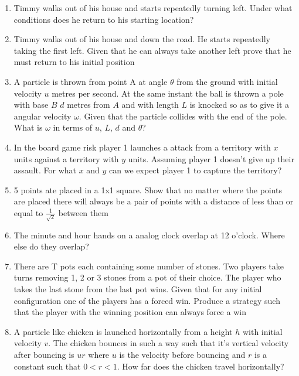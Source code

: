 \documentclass[a4paper]{article}
\begin{document}
\begin{enumerate}
\item
Timmy walks out of his house and starts repeatedly turning left. Under what conditions does he return to his starting location?

\item
Timmy walks out of his house and down the road. He starts repeatedly taking the first left. Given that he can always take another left prove that he must return to his initial position

\item
A particle is thrown from point A at angle $\theta$ from the ground with initial velocity $u$ metres per second. At the same instant the ball is thrown a pole with base $B$ $d$ metres from $A$ and with length $L$ is knocked so as to give it a angular velocity $\omega$. Given that the particle collides with the end of the pole. What is $\omega$ in terms of $u$, $L$, $d$ and $\theta$?

\item
In the board game risk player 1 launches a attack from a territory with $x$ units against a territory with $y$ units. Assuming player 1 doesn’t give up their assault. For what $x$ and $y$ can we expect player 1 to capture the territory?

\item
5 points ate placed in a 1x1 square. Show that no matter where the points are placed there will always be a pair of points with a distance of less than or equal to $\frac{1}{\sqrt{2}}$ between them

\item
The minute and hour hands on a analog clock overlap at 12 o’clock. Where else do they overlap?

\item
There are T pots each containing some number of stones. Two players take turns removing 1, 2 or 3 stones from a pot of their choice. The player who takes the last stone from the last pot wins. Given that for any initial configuration one of the players has a forced win. Produce a strategy such that the player with the winning position can always force a win

\item
A particle like chicken is launched horizontally from a height $h$ with initial velocity $v$. The chicken bounces in such a way such that it’s vertical velocity after bouncing is $ur$ where $u$ is the velocity before bouncing and $r$ is a constant such that $0 < r < 1$. How far does the chicken travel horizontally?


\end{enumerate}
\end{document}
